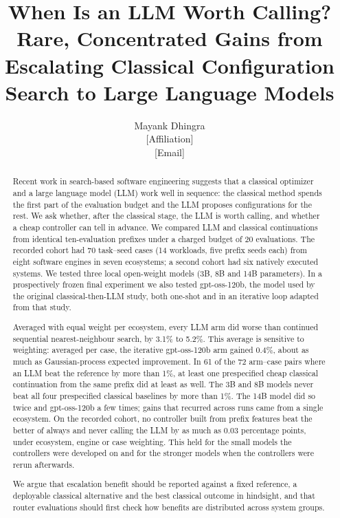 \newcommand{\RQ}[1]{\textbf{RQ#1}}

\title{When Is an LLM Worth Calling?\\[4pt]
\large Rare, Concentrated Gains from Escalating Classical Configuration Search to Large Language Models}

\author{Mayank Dhingra\\
\small [Affiliation]\\
\small [Email]}

\date{}


\maketitle

\begin{abstract}
Recent work in search-based software engineering suggests that a classical optimizer and a large language model (LLM) work well in sequence: the classical method spends the first part of the evaluation budget and the LLM proposes configurations for the rest. We ask whether, after the classical stage, the LLM is worth calling, and whether a cheap controller can tell in advance. We compared LLM and classical continuations from identical ten-evaluation prefixes under a charged budget of 20 evaluations. The recorded cohort had 70 task--seed cases (14 workloads, five prefix seeds each) from eight software engines in seven ecosystems; a second cohort had six natively executed systems. We tested three local open-weight models (3B, 8B and 14B parameters). In a prospectively frozen final experiment we also tested gpt-oss-120b, the model used by the original classical-then-LLM study, both one-shot and in an iterative loop adapted from that study.

Averaged with equal weight per ecosystem, every LLM arm did worse than continued sequential nearest-neighbour search, by 3.1\% to 5.2\%. This average is sensitive to weighting: averaged per case, the iterative gpt-oss-120b arm gained 0.4\%, about as much as Gaussian-process expected improvement. In 61 of the 72 arm--case pairs where an LLM beat the reference by more than 1\%, at least one prespecified cheap classical continuation from the same prefix did at least as well. The 3B and 8B models never beat all four prespecified classical baselines by more than 1\%. The 14B model did so twice and gpt-oss-120b a few times; gains that recurred across runs came from a single ecosystem. On the recorded cohort, no controller built from prefix features beat the better of always and never calling the LLM by as much as 0.03 percentage points, under ecosystem, engine or case weighting. This held for the small models the controllers were developed on and for the stronger models when the controllers were rerun afterwards.

We argue that escalation benefit should be reported against a fixed reference, a deployable classical alternative and the best classical outcome in hindsight, and that router evaluations should first check how benefits are distributed across system groups.
\end{abstract}

